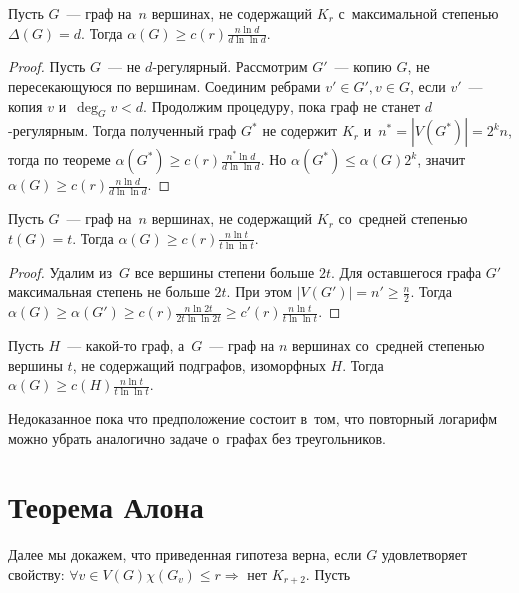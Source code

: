 \documentclass{article}
\begin{document}
\begin{corollary}
	Пусть $G$~--- граф на~$n$ вершинах, не содержащий $K_r$ с~максимальной
	степенью $\Delta(G) = d$. Тогда $\alpha(G) \ge c(r)
	\frac{n \ln d}{d \ln \ln d}$.
\end{corollary}
\begin{proof}
	Пусть $G$~--- не $d$-регулярный. Рассмотрим $G'$~--- копию $G$, не
	пересекающуюся по вершинам. Соединим ребрами $v' \in G', v \in G$, если
	$v'$~--- копия $v$ и~$\deg_G v < d$. Продолжим процедуру, пока граф не станет
	$d$-регулярным. Тогда полученный граф $G^\ast$ не содержит $K_r$ и~$n^\ast =
	|V(G^\ast)| = 2^k n$, тогда по теореме $\alpha(G^\ast) \ge c(r) \frac{n^\ast
	\ln d}{d \ln \ln d}$. Но $\alpha(G^\ast) \le \alpha(G) 2^k$, значит $\alpha(G)
	\ge c(r) \frac{n \ln d}{d \ln \ln d}$.
\end{proof}

\begin{corollary}
	Пусть $G$~--- граф на~$n$ вершинах, не содержащий $K_r$ со~средней
	степенью $t(G) = t$. Тогда $\alpha(G) \ge c(r) \frac{n \ln t}{t \ln \ln t}$.
\end{corollary}
\begin{proof}
	Удалим из~$G$ все вершины степени больше $2t$. Для оставшегося графа $G'$
	максимальная степень не больше $2t$. При этом $|V(G')| = n' \ge \frac{n}{2}$.
	Тогда $\alpha(G) \ge \alpha(G') \ge c(r) \frac{n \ln 2t}{2t \ln \ln 2t} \ge
	c'(r) \frac{n \ln t}{t \ln \ln t}$.
\end{proof}

\begin{corollary}
	Пусть $H$~--- какой-то граф, а~$G$~--- граф на $n$ вершинах со~средней
	степенью вершины $t$, не содержащий подграфов, изоморфных $H$. Тогда
	$\alpha(G) \ge c(H) \frac{n \ln t}{t \ln \ln t}$.
\end{corollary}

Недоказанное пока что предположение состоит в~том, что повторный логарифм можно
убрать аналогично задаче о~графах без треугольников.

\section{Теорема Алона}

Далее мы докажем, что приведенная гипотеза верна, если $G$ удовлетворяет
свойству: $\forall v \in V(G) \chi(G_v) \le r \Rightarrow $ нет $K_{r+2}$. Пусть
\end{document}
